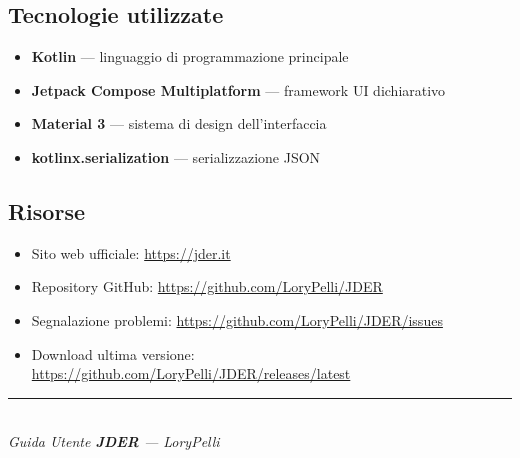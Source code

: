\documentclass[a4paper,11pt]{article}
\newcommand{\jder}{\textbf{JDER}}
\newcommand{\theauthor}{LoryPelli}
\begin{document}
\subsection*{Tecnologie utilizzate}
\begin{itemize}
  \item \textbf{Kotlin} --- linguaggio di programmazione principale
  \item \textbf{Jetpack Compose Multiplatform} --- framework UI dichiarativo
  \item \textbf{Material 3} --- sistema di design dell'interfaccia
  \item \textbf{kotlinx.serialization} --- serializzazione JSON
\end{itemize}

\subsection*{Risorse}
\begin{itemize}
  \item Sito web ufficiale: \url{https://jder.it}
  \item Repository GitHub: \url{https://github.com/LoryPelli/JDER}
  \item Segnalazione problemi: \url{https://github.com/LoryPelli/JDER/issues}
  \item Download ultima versione: \url{https://github.com/LoryPelli/JDER/releases/latest}
\end{itemize}

\vfill
\begin{center}
  \textcolor{jderorange}{\rule{8cm}{1pt}}\\[4pt]
  {\small \textit{Guida Utente \jder{} --- \theauthor}}
\end{center}
\end{document}
